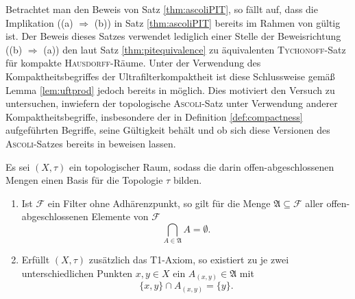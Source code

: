 Betrachtet man den Beweis von Satz \ref{thm:ascoliPIT}, so fällt auf, dass die Implikation ((a) $\Rightarrow$ (b)) in Satz \ref{thm:ascoliPIT} bereits im Rahmen von \ZF gültig ist.
Der Beweis dieses Satzes verwendet lediglich einer Stelle der Beweisrichtung ((b) $\Rightarrow$ (a)) den laut Satz \ref{thm:pitequivalence} zu \PIT äquivalenten \textsc{Tychonoff}\hyp{}Satz für kompakte \textsc{Hausdorff}\hyp{}Räume.
Unter der Verwendung des Kompaktheitsbegriffes der Ultrafilterkompaktheit ist diese Schlussweise gemäß Lemma \ref{lem:uftprod} jedoch bereits in \ZF möglich.  
Dies motiviert den Versuch zu untersuchen, inwiefern der topologische \textsc{Ascoli}\hyp{}Satz unter Verwendung anderer Kompaktheitsbegriffe, insbesondere der in Definition \ref{def:compactness} aufgeführten Begriffe, seine Gültigkeit behält und ob sich diese Versionen des \textsc{Ascoli}\hyp{}Satzes bereits in \ZF beweisen lassen.

\begin{lem}
  \label{lem:filterclusterpoint}
  Es sei $(X,\tau)$ ein topologischer Raum, sodass die darin offen\hyp{}abgeschlossenen Mengen einen Basis für die Topologie $\tau$ bilden.
  \begin{enumerate}[(1)]
    \item Ist $\mathcal{F}$ ein Filter ohne Adhärenzpunkt, so gilt für die Menge $\mathfrak{A} \subseteq \mathcal{F}$ aller offen\hyp{}abgeschlossenen Elemente von $\mathcal{F}$
     \begin{displaymath}
       \bigcap_{A \in \mathfrak{A}} A = \emptyset.
     \end{displaymath}
   \item Erfüllt $(X,\tau)$ zusätzlich das T1\hyp{}Axiom, so existiert zu je zwei unterschiedlichen Punkten $x,y \in X$ ein $A_{(x,y)} \in \mathfrak{A}$ mit 
     \begin{displaymath}
       \{x,y\} \cap A_{(x,y)} = \{y\}.
     \end{displaymath}
  \end{enumerate}
\end{lem}

